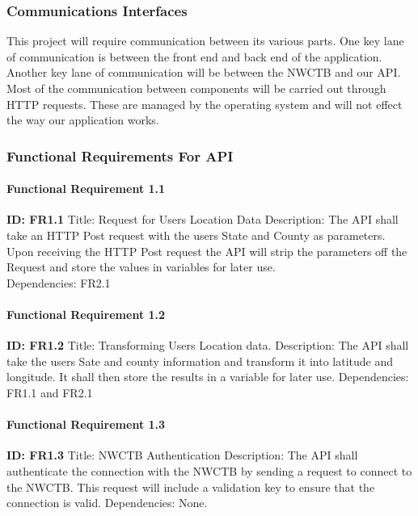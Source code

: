 \documentclass[onecolumn, draftclsnofoot,10pt, compsoc]{article}
\begin{document}
        \subsubsection{Communications Interfaces}
					This project will require communication between its various parts. One key lane of communication is between the front end and back end of the application. Another key lane of communication will be between the NWCTB and our API. Most of the communication between components will be carried out through HTTP requests. These are managed by the operating system and will not effect the way our application works.\\

			\subsubsection{Functional Requirements For API}
					\paragraph{Functional Requirement 1.1}
						\textbf{ID: FR1.1}\hfill \break
						Title: Request for Users Location Data\hfill \break
						Description: The API shall take an HTTP Post request with the users State and County as parameters. Upon receiving the HTTP Post request the API will strip the parameters off the Request and store the values in variables for later use.\\
						Dependencies: FR2.1\hfill \break

					\paragraph{Functional Requirement 1.2}
						\textbf{ID: FR1.2}\newline
						Title: Transforming Users Location data.\newline
						Description: The API shall take the users Sate and county information and transform it into latitude and longitude. It shall then store the results in a variable for later use.\newline
						Dependencies: FR1.1 and FR2.1\newline

					\paragraph{Functional Requirement 1.3}
						\textbf{ID: FR1.3}\newline
						Title: NWCTB Authentication
						Description: The API shall authenticate the connection with the NWCTB by sending a request to connect to the NWCTB. This request will include a validation key to ensure that the connection is valid.\newline
						Dependencies: None.\newline
\end{document}
